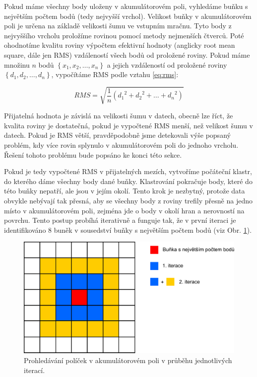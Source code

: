\documentclass[11pt,twoside,a4paper]{book}
\begin{document}
Pokud máme všechny body uloženy v akumulátorovém poli, vyhledáme buňku s největším počtem bodů (tedy nejvyšší vrchol). Velikost buňky v akumulátorovém poli je určena na základě velikosti šumu ve vstupním mračnu. Tyto body z nejvyššího vrcholu proložíme rovinou pomocí metody nejmenších čtverců. Poté ohodnotíme kvalitu roviny výpočtem efektivní hodnoty (anglicky root mean square, dále jen RMS) vzdáleností všech bodů od proložené roviny. Pokud máme množinu $n$ bodů $\left\{x_1, x_2, \ldots , x_n\right\}$ a jejich vzdáleností od proložené roviny $\left\{d_1, d_2, \ldots , d_n\right\}$, vypočítáme RMS podle vztahu \ref{eq:rms}:

\begin{equation} 
\label{eq:rms}
RMS = \sqrt{
\frac{1}{n}\left({d_1}^2 + {d_2}^2 + \ldots + {d_n}^2\right)
}
\end{equation}

Přijatelná hodnota je závislá na velikosti šumu v datech, obecně lze říct, že kvalita roviny je dostatečná, pokud je vypočtené RMS menší, než velikost šumu v datech. Pokud je RMS větší, pravděpodobně jsme detekovali výše popsaný problém, kdy více rovin splynulo v akumulátorovém poli do jednoho vrcholu. Řešení tohoto problému bude popsáno ke konci této sekce.

Pokud je tedy vypočtené RMS v přijatelných mezích, vytvoříme počáteční klastr, do kterého dáme všechny body dané buňky. Klastrování pokračuje body, které do této buňky nepatří, ale jsou v jejím okolí. Tento krok je nezbytný, protože data obvykle nebývají tak přesná, aby se všechny body z roviny trefily přesně na jedno místo v akumulátorovém poli, zejména jde o body v okolí hran a nerovností na povrchu. Tento postup probíhá iterativně a funguje tak, že v první iteraci je identifikováno 8 buněk v sousedství buňky s největším počtem bodů (viz Obr. \ref{fig:acc-pole-clus}). 

\begin{figure}[ht]
\begin{center}
\includegraphics[width=12cm]{figures/acc-pole-clustering}
\caption{Prohledávání políček v akumulátorovém poli v průběhu jednotlivých iterací.}
\label{fig:acc-pole-clus}
\end{center}
\end{figure}
\end{document}
